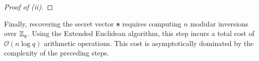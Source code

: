 \begin{proof}[Proof of  (ii)]
\end{proof}

Finally, recovering the secret vector $\mathbf{s}$ requires computing $n$ modular inversions over $\mathbb{Z}_q$. Using the Extended Euclidean algorithm, this step incurs a total cost of $\mathcal{O}(n \log q)$ arithmetic operations. This cost is asymptotically dominated by the complexity of the preceding steps.
